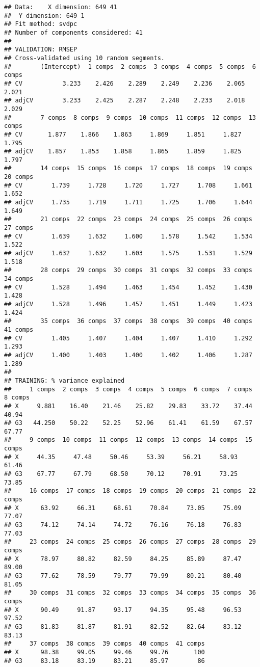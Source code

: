 \documentclass[
]{article}
\begin{document}
\begin{verbatim}
## Data:    X dimension: 649 41 
##  Y dimension: 649 1
## Fit method: svdpc
## Number of components considered: 41
## 
## VALIDATION: RMSEP
## Cross-validated using 10 random segments.
##        (Intercept)  1 comps  2 comps  3 comps  4 comps  5 comps  6 comps
## CV           3.233    2.426    2.289    2.249    2.236    2.065    2.021
## adjCV        3.233    2.425    2.287    2.248    2.233    2.018    2.029
##        7 comps  8 comps  9 comps  10 comps  11 comps  12 comps  13 comps
## CV       1.877    1.866    1.863     1.869     1.851     1.827     1.795
## adjCV    1.857    1.853    1.858     1.865     1.859     1.825     1.797
##        14 comps  15 comps  16 comps  17 comps  18 comps  19 comps  20 comps
## CV        1.739     1.728     1.720     1.727     1.708     1.661     1.652
## adjCV     1.735     1.719     1.711     1.725     1.706     1.644     1.649
##        21 comps  22 comps  23 comps  24 comps  25 comps  26 comps  27 comps
## CV        1.639     1.632     1.600     1.578     1.542     1.534     1.522
## adjCV     1.632     1.632     1.603     1.575     1.531     1.529     1.518
##        28 comps  29 comps  30 comps  31 comps  32 comps  33 comps  34 comps
## CV        1.528     1.494     1.463     1.454     1.452     1.430     1.428
## adjCV     1.528     1.496     1.457     1.451     1.449     1.423     1.424
##        35 comps  36 comps  37 comps  38 comps  39 comps  40 comps  41 comps
## CV        1.405     1.407     1.404     1.407     1.410     1.292     1.293
## adjCV     1.400     1.403     1.400     1.402     1.406     1.287     1.289
## 
## TRAINING: % variance explained
##     1 comps  2 comps  3 comps  4 comps  5 comps  6 comps  7 comps  8 comps
## X     9.881    16.40    21.46    25.82    29.83    33.72    37.44    40.94
## G3   44.250    50.22    52.25    52.96    61.41    61.59    67.57    67.77
##     9 comps  10 comps  11 comps  12 comps  13 comps  14 comps  15 comps
## X     44.35     47.48     50.46     53.39     56.21     58.93     61.46
## G3    67.77     67.79     68.50     70.12     70.91     73.25     73.85
##     16 comps  17 comps  18 comps  19 comps  20 comps  21 comps  22 comps
## X      63.92     66.31     68.61     70.84     73.05     75.09     77.07
## G3     74.12     74.14     74.72     76.16     76.18     76.83     77.03
##     23 comps  24 comps  25 comps  26 comps  27 comps  28 comps  29 comps
## X      78.97     80.82     82.59     84.25     85.89     87.47     89.00
## G3     77.62     78.59     79.77     79.99     80.21     80.40     81.05
##     30 comps  31 comps  32 comps  33 comps  34 comps  35 comps  36 comps
## X      90.49     91.87     93.17     94.35     95.48     96.53     97.52
## G3     81.83     81.87     81.91     82.52     82.64     83.12     83.13
##     37 comps  38 comps  39 comps  40 comps  41 comps
## X      98.38     99.05     99.46     99.76       100
## G3     83.18     83.19     83.21     85.97        86
\end{verbatim}
\end{document}
